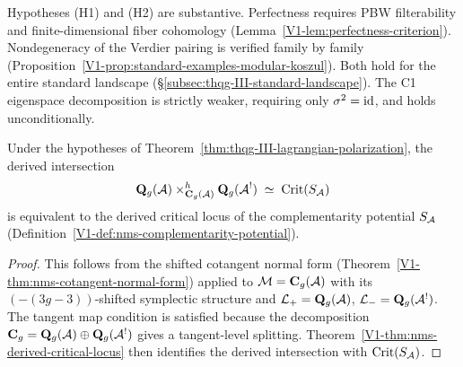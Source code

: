 \begin{remark}[Conditionality of (C2)]
Hypotheses (H1) and (H2) are substantive. Perfectness
requires PBW filterability and finite-dimensional fiber
cohomology (Lemma~\ref{V1-lem:perfectness-criterion}).
Nondegeneracy of the Verdier pairing is verified family
by family
(Proposition~\ref{V1-prop:standard-examples-modular-koszul}).
Both hold for the entire standard landscape
(\S\ref{subsec:thqg-III-standard-landscape}). The C1
eigenspace decomposition is strictly weaker, requiring
only $\sigma^2 = \mathrm{id}$, and holds unconditionally.
\end{remark}

\begin{corollary}
Under the hypotheses of
Theorem~\textup{\ref{thm:thqg-III-lagrangian-polarization}},
the derived intersection
\begin{equation}%
\mathbf{Q}_g(\cA)
\times^h_{\mathbf{C}_g(\cA)}
\mathbf{Q}_g(\cA^!)
\;\simeq\;
\operatorname{Crit}(S_\cA)
\end{equation}
is equivalent to the derived critical locus of the
complementarity potential $S_{\mathcal{A}}$
\textup{(}Definition~\textup{\ref{V1-def:nms-complementarity-potential})}.
\end{corollary}

\begin{proof}
This follows from the shifted cotangent normal form
(Theorem~\ref{V1-thm:nms-cotangent-normal-form}) applied to
$\mathcal{M} = \mathbf{C}_g(\mathcal{A})$ with its
$(-(3g-3))$-shifted symplectic structure and
$\mathcal{L}_+ = \mathbf{Q}_g(\mathcal{A})$,
$\mathcal{L}_- = \mathbf{Q}_g(\mathcal{A}^!)$.
The tangent map condition is satisfied because the
decomposition $\mathbf{C}_g = \mathbf{Q}_g(\mathcal{A}) \oplus
\mathbf{Q}_g(\mathcal{A}^!)$ gives a tangent-level splitting.
Theorem~\ref{V1-thm:nms-derived-critical-locus} then identifies
the derived intersection with $\operatorname{Crit}(S_{\mathcal{A}})$.
\end{proof}

